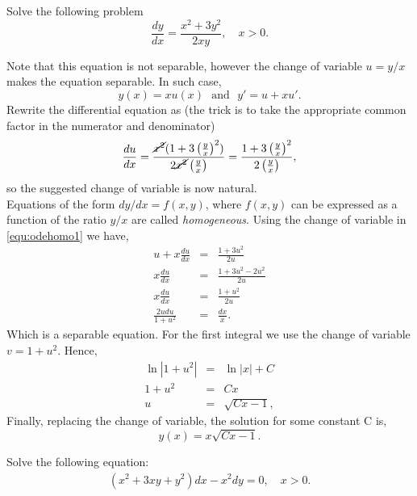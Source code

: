 \documentclass[11pt]{article}
\begin{document}
\begin{problem}
Solve the following problem
\begin{equation*}
\frac{dy}{dx}=\frac{x^{2}+3y^{2}}{2xy}, \quad x>0. 
\end{equation*}
\end{problem}
\begin{solution}
Note that this equation is not separable, however the change of variable $u=y/x$ makes the equation separable. In such case,
$$y(x)=x u(x) \,\,\text{ and }\,\, y'=u + x u'.$$ Rewrite the differential equation as (the trick is to take the appropriate common factor in the numerator and denominator)
\begin{equation}\label{equ:odehomo1}
     \frac{du}{dx}=\frac{\cancel{x^{2}}(1+3\left(\frac{y}{x}\right)^{2})}{2\cancel{x^{2}}\left(\frac{y}{x}\right)}=\frac{1+3\left(\frac{y}{x}\right)^{2}}{2\left(\frac{y}{x}\right)},
\end{equation}
so the suggested change of variable is now natural. \\
Equations of the form $dy/dx = f(x,y)$, where $f(x,y)$ can be expressed as a function of the ratio $y/x$ are called \textit{homogeneous}. Using the change of variable in \eqref{equ:odehomo1} we have,
\begin{eqnarray*}
u +x \frac{du}{dx}& = & \frac{1+3u^{2}}{2u}\\
x\frac{du}{dx} & = & \frac{1+3u^2 -2u^2}{2u}\\
x\frac{du}{dx}& = & \frac{1+u^{2}}{2u}\\
\frac{2udu}{1+u^{2}}& = &\frac{dx}{x}. 
\end{eqnarray*}
Which is a separable equation. For the first integral we use the change of variable $v=1+u^{2}$. Hence,
\begin{eqnarray*}
\ln |1+u^{2}|& = & \ln |x| + C\\
1+u^2& = & C x\\
u & = &\sqrt{C x - 1},
\end{eqnarray*}
Finally, replacing the change of variable, the solution for some constant C is,
\begin{equation*}
\boxed{y(x)=x\sqrt{C x - 1}}.
\end{equation*}

\end{solution}



\begin{problem}
  Solve the following equation:
  \begin{equation}
    \begin{aligned}
      \left( x^2 + 3x y + y^2 \right)dx - x^2 dy = 0, \quad x>0.
    \end{aligned}
  \end{equation}
\end{problem}
\end{document}
